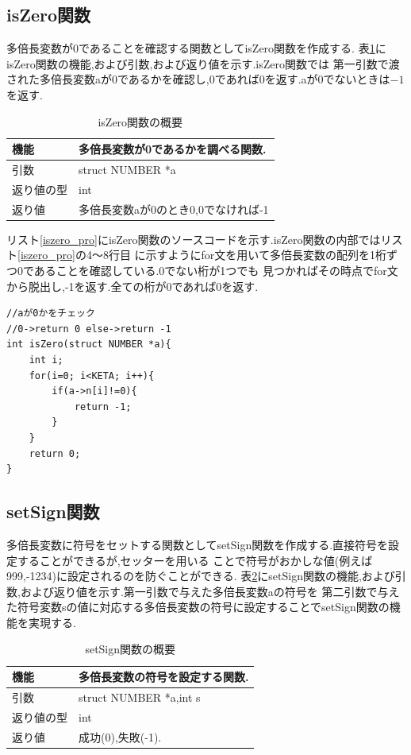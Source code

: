 \documentclass[a4j] {jarticle}
\begin{document}
\subsection{isZero関数}
  多倍長変数が$0$であることを確認する関数としてisZero関数を作成する.
  表\ref{isZero}にisZero関数の機能,および引数,および返り値を示す.isZero関数では
  第一引数で渡された多倍長変数aが$0$であるかを確認し,$0$であれば$0$を返す.aが$0$でないときは$-1$を返す.
  \begin{table}[H]
    \caption{isZero関数の概要}
    \label{isZero}
    \begin{center}
        \begin{tabular}{|l|l|}\hline
        機能 & 多倍長変数が0であるかを調べる関数.\\ \hline
        引数 & struct NUMBER *a\\ \hline
        返り値の型 & int\\ \hline
        返り値 & 多倍長変数aが0のとき0,0でなければ-1\\ \hline
        \end{tabular}
    \end{center}
    \end{table}

    リスト\ref{iszero_pro}にisZero関数のソースコードを示す.isZero関数の内部ではリスト\ref{iszero_pro}の4～8行目
    に示すようにfor文を用いて多倍長変数の配列を1桁ずつ0であることを確認している.0でない桁が1つでも
    見つかればその時点でfor文から脱出し,-1を返す.全ての桁が0であれば0を返す.
    \begin{lstlisting}[basicstyle=\ttfamily\footnotesize, frame=single,label=iszero_pro,caption=isZero関数のソースコード]
//aが0かをチェック
//0->return 0 else->return -1 
int isZero(struct NUMBER *a){
    int i;
    for(i=0; i<KETA; i++){
        if(a->n[i]!=0){
            return -1;
        }
    }
    return 0;
}
    \end{lstlisting}
\subsection{setSign関数}
  多倍長変数に符号をセットする関数としてsetSign関数を作成する.直接符号を設定することができるが,セッターを用いる
  ことで符号がおかしな値(例えば999,-1234)に設定されるのを防ぐことができる.
表\ref{setSign}にsetSign関数の機能,および引数,および返り値を示す.第一引数で与えた多倍長変数aの符号を
第二引数で与えた符号変数sの値に対応する多倍長変数の符号に設定することでsetSign関数の機能を実現する.
\begin{table}[H]
  \caption{setSign関数の概要}
  \label{setSign}
  \begin{center}
      \begin{tabular}{|l|l|}\hline
      機能 & 多倍長変数の符号を設定する関数.\\ \hline
      引数 & struct NUMBER *a,int s\\ \hline
      返り値の型 & int\\ \hline
      返り値 & 成功(0),失敗(-1).\\ \hline
      \end{tabular}
  \end{center}
  \end{table}
\end{document}
